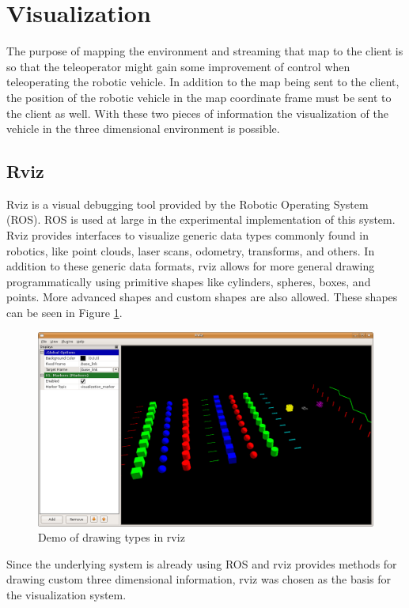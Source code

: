 \documentclass[12pt]{report}
\begin{document}
\section{Visualization}
The purpose of mapping the environment and streaming that map to the client is so that the teleoperator might gain some improvement of control when teleoperating the robotic vehicle.  In addition to the map being sent to the client, the position of the robotic vehicle in the map coordinate frame must be sent to the client as well.  With these two pieces of information the visualization of the vehicle in the three dimensional environment is possible.

\subsection{Rviz}
Rviz\cite{rviz} is a visual debugging tool provided by the Robotic Operating System (ROS)\cite{quigley2009ros}.  ROS is used at large in the experimental implementation of this system.  Rviz provides interfaces to visualize generic data types commonly found in robotics, like point clouds, laser scans, odometry, transforms, and others.  In addition to these generic data formats, rviz allows for more general drawing programmatically using primitive shapes like cylinders, spheres, boxes, and points.  More advanced shapes and custom shapes are also allowed.  These shapes can be seen in Figure \ref{fig:rviz_shapes}.

\begin{figure}[ht]
  \centering
  \includegraphics[width=6in,keepaspectratio]{rviz_shapes.png}
  \caption{Demo of drawing types in rviz\cite{rviz_shapes}}
  \label{fig:rviz_shapes}
\end{figure}

Since the underlying system is already using ROS and rviz provides methods for drawing custom three dimensional information, rviz was chosen as the basis for the visualization system.
\end{document}
